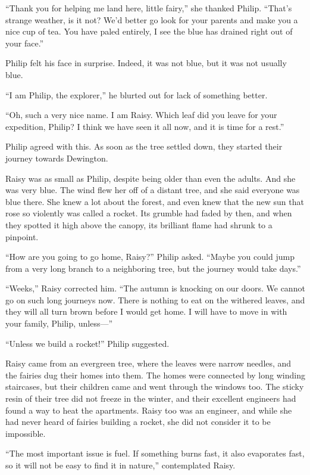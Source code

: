 \documentclass[10pt, draft]{memoir}
\begin{document}
``Thank you for helping me land here, little fairy,'' she thanked Philip.
``That's strange weather, is it not? We'd better go look for your parents and
make you a nice cup of tea. You have paled entirely, I see the blue has drained
right out of your face.''

Philip felt his face in surprise. Indeed, it was not blue, but it was not
usually blue.

``I am Philip, the explorer,'' he blurted out for lack of something better.

``Oh, such a very nice name. I am Raisy. Which leaf did you leave for your
expedition, Philip? I think we have seen it all now, and it is time for a
rest.''

Philip agreed with this. As soon as the tree settled down, they started their
journey towards Dewington.

Raisy was as small as Philip, despite being older than even the adults. And she
was very blue. The wind flew her off of a distant tree, and she said everyone
was blue there. She knew a lot about the forest, and even knew that the new sun
that rose so violently was called a rocket. Its grumble had faded by then, and
when they spotted it high above the canopy, its brilliant flame had shrunk to a
pinpoint.

``How are you going to go home, Raisy?'' Philip asked. ``Maybe you could jump
from a very long branch to a neighboring tree, but the journey would take
days.''

``Weeks,'' Raisy corrected him. ``The autumn is knocking on our doors. We
cannot go on such long journeys now. There is nothing to eat on the withered
leaves, and they will all turn brown before I would get home. I will have to
move in with your family, Philip, unless---''

``Unless we build a rocket!'' Philip suggested.

Raisy came from an evergreen tree, where the leaves were narrow needles, and
the fairies dug their homes into them. The homes were connected by long winding
staircases, but their children came and went through the windows too. The
sticky resin of their tree did not freeze in the winter, and their excellent
engineers had found a way to heat the apartments. Raisy too was an engineer,
and while she had never heard of fairies building a rocket, she did not
consider it to be impossible.

``The most important issue is fuel. If something burns fast, it also evaporates
fast, so it will not be easy to find it in nature,'' contemplated Raisy.
\end{document}
